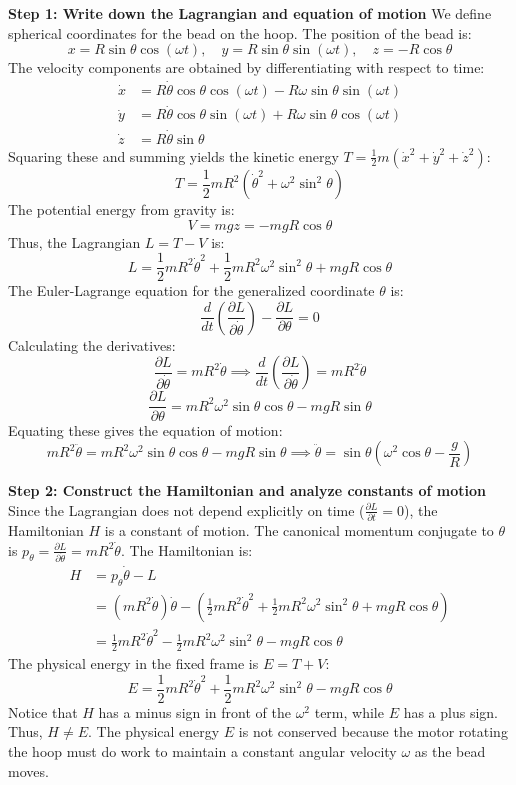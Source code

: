 \begin{solution}
\textbf{Step 1: Write down the Lagrangian and equation of motion}
We define spherical coordinates for the bead on the hoop. The position of the bead is:
\[ x = R \sin\theta \cos(\omega t), \quad y = R \sin\theta \sin(\omega t), \quad z = -R \cos\theta \]
The velocity components are obtained by differentiating with respect to time:
\[ \begin{aligned}
    \dot{x} &= R \dot{\theta} \cos\theta \cos(\omega t) - R \omega \sin\theta \sin(\omega t) \\
    \dot{y} &= R \dot{\theta} \cos\theta \sin(\omega t) + R \omega \sin\theta \cos(\omega t) \\
    \dot{z} &= R \dot{\theta} \sin\theta
\end{aligned} \]
Squaring these and summing yields the kinetic energy $T = \frac{1}{2}m(\dot{x}^2 + \dot{y}^2 + \dot{z}^2)$:
\[ T = \frac{1}{2}m R^2 (\dot{\theta}^2 + \omega^2 \sin^2\theta) \]
The potential energy from gravity is:
\[ V = mgz = -mgR \cos\theta \]
Thus, the Lagrangian $L = T - V$ is:
\[ L = \frac{1}{2}m R^2 \dot{\theta}^2 + \frac{1}{2}m R^2 \omega^2 \sin^2\theta + mgR \cos\theta \]
The Euler-Lagrange equation for the generalized coordinate $\theta$ is:
\[ \frac{d}{dt} \left( \frac{\partial L}{\partial \dot{\theta}} \right) - \frac{\partial L}{\partial \theta} = 0 \]
Calculating the derivatives:
\[ \frac{\partial L}{\partial \dot{\theta}} = m R^2 \dot{\theta} \implies \frac{d}{dt} \left( \frac{\partial L}{\partial \dot{\theta}} \right) = m R^2 \ddot{\theta} \]
\[ \frac{\partial L}{\partial \theta} = m R^2 \omega^2 \sin\theta \cos\theta - mgR \sin\theta \]
Equating these gives the equation of motion:
\[ m R^2 \ddot{\theta} = m R^2 \omega^2 \sin\theta \cos\theta - mgR \sin\theta \implies \ddot{\theta} = \sin\theta \left( \omega^2 \cos\theta - \frac{g}{R} \right) \]

\textbf{Step 2: Construct the Hamiltonian and analyze constants of motion}
Since the Lagrangian does not depend explicitly on time ($\frac{\partial L}{\partial t} = 0$), the Hamiltonian $H$ is a constant of motion.
The canonical momentum conjugate to $\theta$ is $p_\theta = \frac{\partial L}{\partial \dot{\theta}} = m R^2 \dot{\theta}$.
The Hamiltonian is:
\[ \begin{aligned}
    H &= p_\theta \dot{\theta} - L \\
      &= (m R^2 \dot{\theta}) \dot{\theta} - \left( \frac{1}{2}m R^2 \dot{\theta}^2 + \frac{1}{2}m R^2 \omega^2 \sin^2\theta + mgR \cos\theta \right) \\
      &= \frac{1}{2}m R^2 \dot{\theta}^2 - \frac{1}{2}m R^2 \omega^2 \sin^2\theta - mgR \cos\theta
\end{aligned} \]
The physical energy in the fixed frame is $E = T + V$:
\[ E = \frac{1}{2}m R^2 \dot{\theta}^2 + \frac{1}{2}m R^2 \omega^2 \sin^2\theta - mgR \cos\theta \]
Notice that $H$ has a minus sign in front of the $\omega^2$ term, while $E$ has a plus sign. Thus, $H \neq E$. The physical energy $E$ is not conserved because the motor rotating the hoop must do work to maintain a constant angular velocity $\omega$ as the bead moves.


\end{solution}
